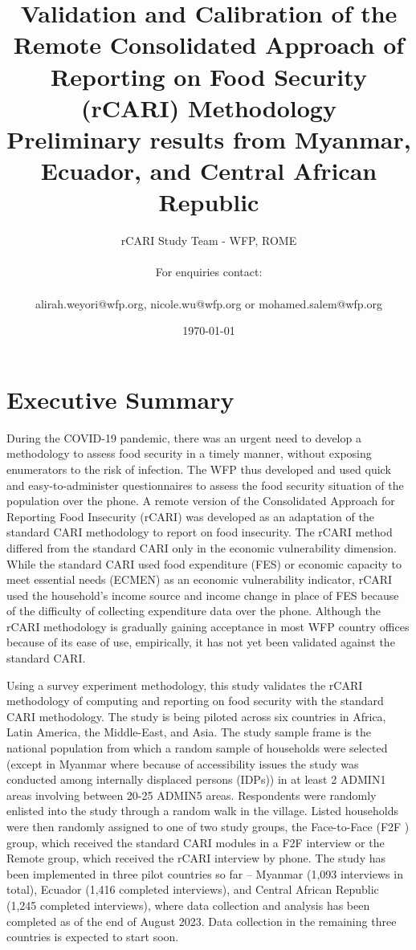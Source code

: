 \documentclass[11pt,harvard]{article}
\author{rCARI Study Team - WFP, ROME \\	\\For enquiries contact:\\		\\alirah.weyori@wfp.org, nicole.wu@wfp.org or mohamed.salem@wfp.org}
\date{\today}
\title{Validation and Calibration of the Remote Consolidated Approach of Reporting on Food Security (rCARI) Methodology 
	\\ {\normalsize Preliminary results from Myanmar, Ecuador, and Central African Republic}}
\begin{document}
	\maketitle \vspace{-1cm}
	\onehalfspacing
	\pagebreak
	\setlength{\parskip}{8pt} %
	
	\tableofcontents
	\pagebreak
	
	
\section{Executive Summary}

During the COVID-19 pandemic, there was an urgent need to develop a methodology to assess food security in a timely manner, without exposing enumerators to the risk of infection. The WFP thus developed and used quick and easy-to-administer questionnaires to assess the food security situation of the population over the phone. A remote version of the Consolidated Approach for Reporting Food Insecurity (rCARI) was developed as an adaptation of the standard CARI methodology to report on food insecurity. The rCARI method differed from the standard CARI only in the economic vulnerability dimension. While the standard CARI used food expenditure (FES) or economic capacity to meet essential needs (ECMEN) as an economic vulnerability indicator, rCARI used the household’s income source and income change in place of FES because of the difficulty of collecting expenditure data over the phone. Although the rCARI methodology is gradually gaining acceptance in most WFP country offices because of its ease of use, empirically, it has not yet been validated against the standard CARI.

Using a survey experiment methodology, this study validates the rCARI methodology of computing and reporting on food security with the standard CARI methodology. The study is being piloted across six countries in Africa, Latin America, the Middle-East, and Asia. The study sample frame is the national population from which a random sample of households were selected (except in Myanmar where because of accessibility issues the study was conducted among internally displaced persons (IDPs)) in at least 2 ADMIN1 areas involving between 20-25 ADMIN5 areas. Respondents were randomly enlisted into the study through a random walk in the village. Listed households were then randomly assigned to one of two study groups, the Face-to-Face (F2F ) group, which  received the standard CARI modules in a F2F interview or the Remote group, which received the rCARI interview by phone. The study has been implemented in three pilot countries so far – Myanmar (1,093 interviews in total), Ecuador (1,416 completed interviews), and Central African Republic (1,245 completed interviews), where data collection and analysis has been completed as of the end of August 2023. Data collection in the remaining three countries is expected to start soon.
\end{document}
